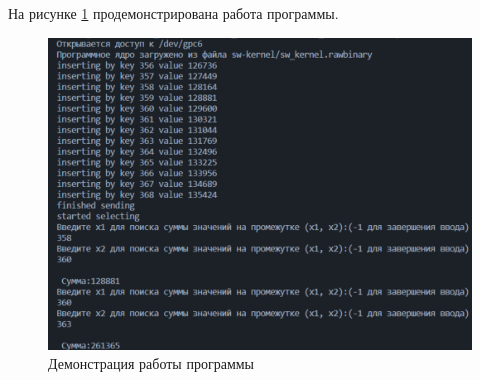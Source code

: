 На рисунке \ref{img:demo} продемонстрирована работа программы.
\begin{figure}[ht!]
	\centering
	\includegraphics[width=170mm]{./img/demo.png}
	\caption{Демонстрация работы программы}
	\label{img:demo}
\end{figure}